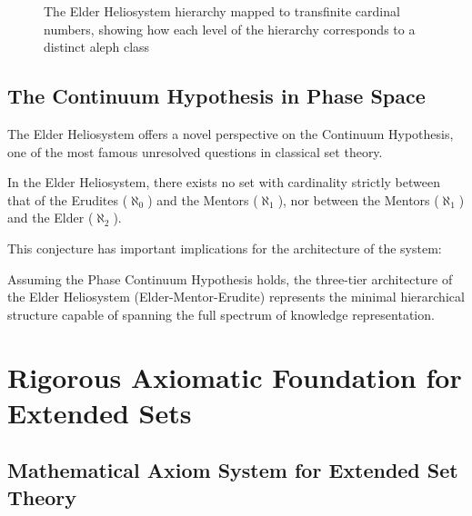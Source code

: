 \begin{theorem}
\begin{definition}
\begin{definition}
\begin{enumerate}
\begin{figure}[h]
\caption{The Elder Heliosystem hierarchy mapped to transfinite cardinal numbers, showing how each level of the hierarchy corresponds to a distinct aleph class}
\label{fig:aleph_hierarchy}
\end{figure}

\subsection{The Continuum Hypothesis in Phase Space}

The Elder Heliosystem offers a novel perspective on the Continuum Hypothesis, one of the most famous unresolved questions in classical set theory.

\begin{conjecture}
In the Elder Heliosystem, there exists no set with cardinality strictly between that of the Erudites ($\aleph_0$) and the Mentors ($\aleph_1$), nor between the Mentors ($\aleph_1$) and the Elder ($\aleph_2$).
\end{conjecture}

This conjecture has important implications for the architecture of the system:

\begin{proposition}
Assuming the Phase Continuum Hypothesis holds, the three-tier architecture of the Elder Heliosystem (Elder-Mentor-Erudite) represents the minimal hierarchical structure capable of spanning the full spectrum of knowledge representation.
\end{proposition}

\section{Rigorous Axiomatic Foundation for Extended Sets}

\subsection{Mathematical Axiom System for Extended Set Theory}


\end{enumerate}
\end{definition}
\end{definition}
\end{theorem}
